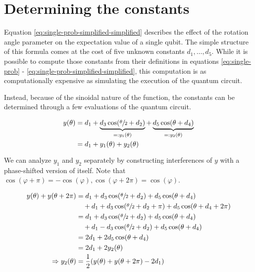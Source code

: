\section{Determining the constants}
Equation \ref{eq:single-prob-simplified-simplified} describes the effect of the
rotation angle parameter on the expectation value of a single qubit.
The simple structure of this formula comes at the cost of five unknown
constants $d_1, \dots, d_5$.
While it is possible to compute those constants from their definitions in
equations \ref{eq:single-prob} - \ref{eq:single-prob-simplified-simplified},
this computation is as computationally expensive as simulating the execution of
the quantum circuit.

Instead, because of the sinoidal nature of the function, the constants can be
determined through a few evaluations of the quantum circuit.

\begin{equation}
    \label{eq:y}
    \begin{split}
        y(\theta)
            &= d_1 + \underbrace{d_3 \cos(\sfrac\theta2 + d_2)}_{=: y_1(\theta)} + \underbrace{d_5 \cos(\theta + d_4)}_{=: y_2(\theta)}\\
            &= d_1 + y_1(\theta) + y_2(\theta)
    \end{split}
\end{equation}

We can analyze $y_1$ and $y_2$ separately by constructing interferences of $y$
with a phase-shifted version of itself.
Note that
$\cos(\varphi + \pi) = -\cos(\varphi), \cos(\varphi + 2\pi) = \cos(\varphi)$.

\begin{equation}
    \label{eq:d1+y2}
    \begin{split}
        y(\theta) + y(\theta + 2\pi)
            &= d_1 + d_3 \cos(\sfrac\theta2 + d_2) + d_5 \cos(\theta + d_4)\\
                &\quad + d_1 + d_3 \cos(\sfrac\theta2 + d_2 + \pi) + d_5 \cos(\theta + d_4 + 2\pi)\\
            &= d_1 + d_3 \cos(\sfrac\theta2 + d_2) + d_5 \cos(\theta + d_4)\\
                &\quad + d_1 - d_3 \cos(\sfrac\theta2 + d_2) + d_5 \cos(\theta + d_4)\\
            &= 2 d_1 + 2 d_5 \cos(\theta + d_4)\\
            &= 2 d_1 + 2 y_2(\theta)\\
        \Rightarrow y_2(\theta) &= \frac12 (y(\theta) + y(\theta + 2\pi) - 2 d_1)
    \end{split}
\end{equation}

